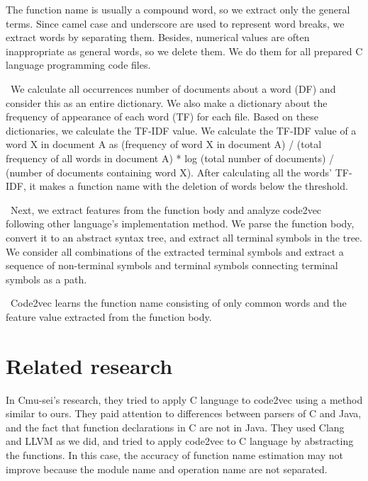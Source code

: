 \documentclass[JIP]{apris}
\begin{document}
The function name is usually a compound word, so we extract only the general terms. Since camel case and underscore are used to represent word breaks, we extract words by separating them.
Besides, numerical values ​​are often inappropriate as general words, so we delete them. We do them for all prepared C language programming code files.

 We calculate all occurrences number of documents about a word (DF) and consider this as an entire dictionary. We also make a dictionary about the frequency of appearance of each word (TF) for each file. Based on these dictionaries, we calculate the TF-IDF value.
We calculate the TF-IDF value of a word X in document A as (frequency of word X in document A) / (total frequency of all words in document A) * log (total number of documents) / (number of documents containing word X).
After calculating all the words' TF-IDF, it makes a function name with the deletion of words below the threshold.

 Next, we extract features from the function body and analyze code2vec following other language's implementation method.
We parse the function body, convert it to an abstract syntax tree, and extract all terminal symbols in the tree.
We consider all combinations of the extracted terminal symbols and extract a sequence of non-terminal symbols and terminal symbols connecting terminal symbols as a path.

 Code2vec learns the function name consisting of only common words and the feature value extracted from the function body.

\section{Related research}
In Cmu-sei's research\cite{code2vec-c}, they tried to apply C language to code2vec using a method similar to ours.
They paid attention to differences between parsers of C and Java, and the fact that function declarations in C are not in Java.
They used Clang and LLVM\cite{lattner2007clang} as we did, and tried to apply code2vec to C language by abstracting the functions.
In this case, the accuracy of function name estimation may not improve because the module name and operation name are not separated.
\end{document}
